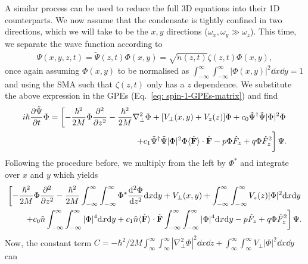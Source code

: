 A similar process can be used to reduce the full 3D equations into their 1D
counterparts.
We now assume that the condensate is tightly confined in two directions, which
we will take to be the \(x, y\) directions (\(\omega_x, \omega_y \gg
\omega_z\)).
This time, we separate the wave function according to
\begin{align}
    \Psi(x, y, z, t) = \tilde{\Psi}(z, t)\Phi(x, y) = \sqrt{\tilde{n}(z, t)}
    \zeta(z, t)\Phi(x, y),
\end{align}
once again assuming \(\Phi(x, y)\) to be normalised as \(\int_{-\infty}^{\infty}
\int_{-\infty}^{\infty} |\Phi(x, y)|^2 \dd x \dd y = 1\) and using the SMA such
that \(\zeta(z, t)\) only has a \(z\) dependence.
We substitute the above expression in the GPEs
(Eq.~\eqref{eq: spin-1-GPEs-matrix}) and find
\begin{equation}
\begin{split}
    i\hbar\pdv{\tilde{\Psi}}{t}\Phi = \left[
        -\frac{\hbar^2}{2M}\Phi\pdv[2]{}{z}
        - \frac{\hbar^2}{2M}\nabla_\perp^2\Phi + [V_\perp(x, y) + V_z(z)]\Phi
        +c_0\tilde{\Psi}^\dagger\tilde{\Psi}|\Phi|^2\Phi\right. \\
        \left.+c_1\tilde{\Psi}^\dagger\tilde{\Psi}|\Phi|^2\Phi
        \langle\hat{\vb{F}}\rangle \cdot \hat{\vb{F}}
        -p\Phi\hat{F}_z + q\Phi\hat{F}_z^2 \vphantom{\int_1^2}\right]\Psi.
\end{split}
\end{equation}
Following the procedure before, we multiply from the left by \(\Phi^*\)
and integrate over \(x\) and \(y\) which yields
\begin{equation}
\begin{split}
    \left[
        -\frac{\hbar^2}{2M}\Phi\pdv[2]{}{z}
        - \frac{\hbar^2}{2M}\int_{-\infty}^{\infty}\int_{-\infty}^{\infty}
        \Phi^*\dv[2]{\Phi}{z} \dd x \dd y
        + V_\perp(x, y) + \int_{-\infty}^{\infty}\int_{-\infty}^{\infty}
        V_z(z)|\Phi|^2 \dd x \dd y\right. \\
        \left.+c_0\tilde{n}\int_{-\infty}^{\infty}\int_{-\infty}^{\infty}
        |\Phi|^4 \dd x \dd y
        +c_1\tilde{n}\langle\hat{\vb{F}}\rangle \cdot \hat{\vb{F}}
        \int_{-\infty}^{\infty}\int_{-\infty}^{\infty}|\Phi|^4 \dd x \dd y
        -p\hat{F}_z + q\Phi\hat{F}_z^2 \right]\Psi.
\end{split}
\end{equation}
Now, the constant term \(C = -\hbar^2/2M\int_{\infty}^{\infty}
\int_{\infty}^{\infty}|\nabla_\perp^2\Phi|^2\dd x \dd z
+\int_{\infty}^{\infty}\int_{\infty}^{\infty}V_\perp|\Phi|^2\dd x \dd y\) can
